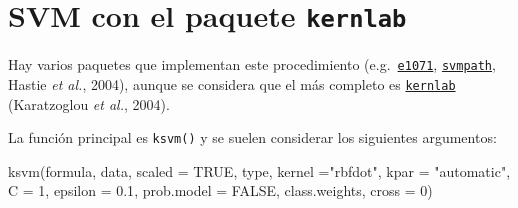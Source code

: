 \documentclass[
]{book}
\newenvironment{Shaded}{\begin{snugshade}}{\end{snugshade}}
\newcommand{\AttributeTok}[1]{\textcolor[rgb]{0.77,0.63,0.00}{#1}}
\newcommand{\ConstantTok}[1]{\textcolor[rgb]{0.00,0.00,0.00}{#1}}
\newcommand{\DecValTok}[1]{\textcolor[rgb]{0.00,0.00,0.81}{#1}}
\newcommand{\FloatTok}[1]{\textcolor[rgb]{0.00,0.00,0.81}{#1}}
\newcommand{\FunctionTok}[1]{\textcolor[rgb]{0.00,0.00,0.00}{#1}}
\newcommand{\NormalTok}[1]{#1}
\newcommand{\StringTok}[1]{\textcolor[rgb]{0.31,0.60,0.02}{#1}}
\theoremstyle{break}
\theoremstyle{definition}
\theoremstyle{definition}
\theoremstyle{definition}
\theoremstyle{definition}
\theoremstyle{remark}
\begin{document}
\hypertarget{svm-con-el-paquete-kernlab}{%
\section{\texorpdfstring{SVM con el paquete \texttt{kernlab}}{SVM con el paquete kernlab}}\label{svm-con-el-paquete-kernlab}}

Hay varios paquetes que implementan este procedimiento (e.g.~\href{https://CRAN.R-project.org/package=e1071}{\texttt{e1071}}, \href{https://CRAN.R-project.org/package=svmpath}{\texttt{svmpath}}, Hastie \emph{et al.}, 2004), aunque se considera que el más completo es \href{https://CRAN.R-project.org/package=kernlab}{\texttt{kernlab}} (Karatzoglou \emph{et al.}, 2004).

La función principal es \texttt{ksvm()} y se suelen considerar los siguientes argumentos:

\begin{Shaded}
\begin{Highlighting}[]
\FunctionTok{ksvm}\NormalTok{(formula, data, }\AttributeTok{scaled =} \ConstantTok{TRUE}\NormalTok{, type,}
  \AttributeTok{kernel =}\StringTok{"rbfdot"}\NormalTok{, }\AttributeTok{kpar =} \StringTok{"automatic"}\NormalTok{,}
  \AttributeTok{C =} \DecValTok{1}\NormalTok{, }\AttributeTok{epsilon =} \FloatTok{0.1}\NormalTok{, }\AttributeTok{prob.model =} \ConstantTok{FALSE}\NormalTok{, }
\NormalTok{  class.weights, }\AttributeTok{cross =} \DecValTok{0}\NormalTok{)}
\end{Highlighting}
\end{Shaded}
\end{document}
